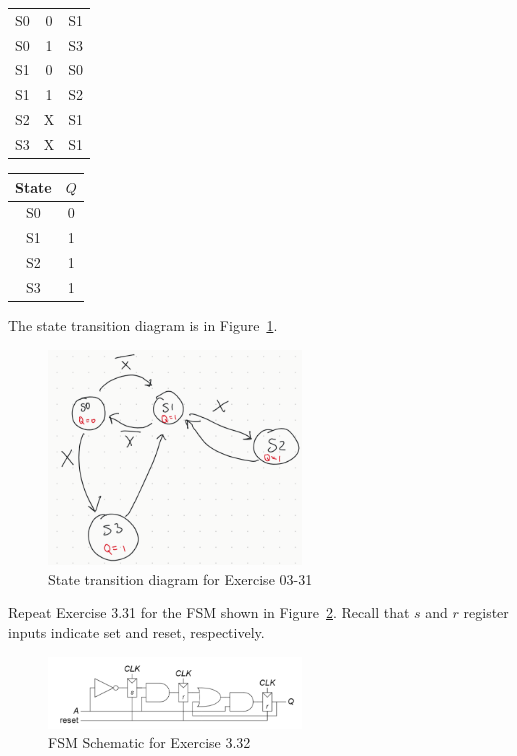 \documentclass[12pt]{article}
\newenvironment{ex}[2][Exercise]{\begin{trivlist}
		\item[\hskip \labelsep {\bfseries #1}\hskip \labelsep {\bfseries #2.}]}{\end{trivlist}}
\newenvironment{sol}[1][Solution]{\begin{trivlist}
		\item[\hskip \labelsep {\bfseries #1:}]}{\end{trivlist}}
\begin{document}
\begin{sol}
\begin{center}
\begin{tabular}{ccc}
			S0 & 0 & S1\\
			S0 & 1 & S3\\
			S1 & 0 & S0\\
			S1 & 1 & S2\\
			S2 & X & S1\\
			S3 & X & S1
		\end{tabular}
		\quad
		\begin{tabular}{c|c}
		State & $Q$\\
		\hline
		S0 & 0\\
		S1 & 1\\
		S2 & 1\\
		S3 & 1
		\end{tabular}
	\end{center}
	The state transition diagram is in Figure~\ref{03-31-state-transition-diagram}.
	\begin{figure}
		\centering
		\includegraphics[width=0.6\textwidth]{03-31-state-transition-diagram}
		\caption{State transition diagram for Exercise 03-31}
		\label{03-31-state-transition-diagram}
	\end{figure}
\end{sol}

\begin{ex}{3.32}
	Repeat Exercise 3.31 for the FSM shown in Figure~\ref{03-32-circuit}. Recall that $s$ and
	$r$ register inputs indicate set and reset,
	respectively.
	\begin{figure}
		\centering
		\includegraphics[width=0.6\textwidth]{03-32-circuit}
		\caption{FSM Schematic for Exercise 3.32}
		\label{03-32-circuit}
	\end{figure}
\end{ex}
\end{document}
